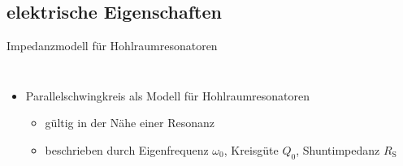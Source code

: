 \documentclass[12pt,xcolor=dvipsnames,professionalfonts]{beamer}
\begin{document}
\subsection{elektrische Eigenschaften}
\begin{frame}{Impedanzmodell für Hohlraumresonatoren}
	\begin{columns}[c]
		\begin{itemize}
			\item Parallelschwingkreis als Modell für Hohlraumresonatoren
			\begin{itemize}
				\setlength\itemsep{0.25em}
				\item gültig in der Nähe einer Resonanz
				
				\item beschrieben durch Eigenfrequenz $\omega_0$, Kreisgüte $Q_0$, Shuntimpedanz $R_\mathrm{S}$
			\end{itemize}
		\end{itemize}
		

\end{columns}
\end{frame}
\end{document}
